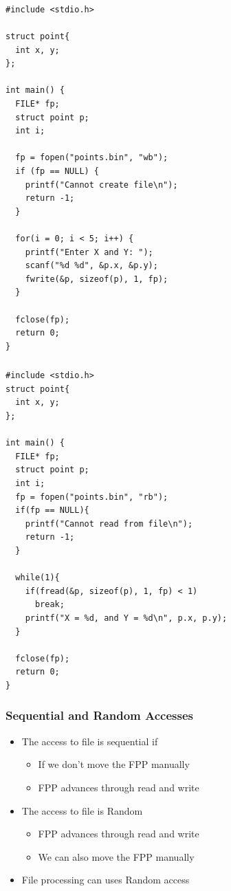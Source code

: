 \documentclass{../c-lecture}
\begin{document}
\begin{frame}
  \frametitle{}
  \begin{verbatim}
#include <stdio.h>

struct point{
  int x, y;
};

int main() {
  FILE* fp;
  struct point p;
  int i;

  fp = fopen("points.bin", "wb");
  if (fp == NULL) {
    printf("Cannot create file\n");
    return -1;
  }

  for(i = 0; i < 5; i++) {
    printf("Enter X and Y: ");
    scanf("%d %d", &p.x, &p.y);
    fwrite(&p, sizeof(p), 1, fp);
  }

  fclose(fp);
  return 0;
}
  \end{verbatim}
\end{frame}

\begin{frame}
  \frametitle{}
  \begin{verbatim}
#include <stdio.h>
struct point{
  int x, y;
};

int main() {
  FILE* fp;
  struct point p;
  int i;
  fp = fopen("points.bin", "rb");
  if(fp == NULL){
    printf("Cannot read from file\n");
    return -1;
  }

  while(1){
    if(fread(&p, sizeof(p), 1, fp) < 1)
      break;
    printf("X = %d, and Y = %d\n", p.x, p.y);
  }

  fclose(fp);
  return 0;
}
  \end{verbatim}
\end{frame}

\begin{frame}
  \frametitle{Sequential and Random Accesses}
  \begin{itemize}
    \item The access to file is sequential if
    \begin{itemize}
      \item If we don’t move the FPP manually
      \item FPP advances through read and write
    \end{itemize}
    \item The access to file is Random
    \begin{itemize}
      \item FPP advances through read and write
      \item We can also move the FPP manually
    \end{itemize}
    \item File processing can uses Random access
  \end{itemize}
\end{frame}
\end{document}
